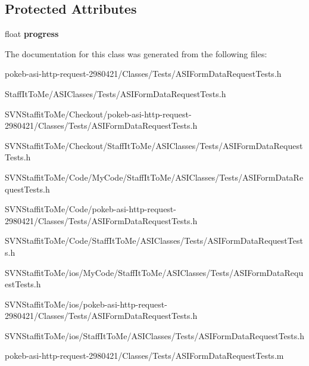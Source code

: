 \subsection*{\-Protected \-Attributes}
\begin{DoxyCompactItemize}
\item 
\hypertarget{interface_a_s_i_form_data_request_tests_a8f8f9838ec97ca7e2b92d8fad2dabdc4}{
float {\bfseries progress}}
\label{interface_a_s_i_form_data_request_tests_a8f8f9838ec97ca7e2b92d8fad2dabdc4}

\end{DoxyCompactItemize}


\-The documentation for this class was generated from the following files\-:\begin{DoxyCompactItemize}
\item 
pokeb-\/asi-\/http-\/request-\/2980421/\-Classes/\-Tests/\-A\-S\-I\-Form\-Data\-Request\-Tests.\-h\item 
\-Staff\-It\-To\-Me/\-A\-S\-I\-Classes/\-Tests/\-A\-S\-I\-Form\-Data\-Request\-Tests.\-h\item 
\-S\-V\-N\-Staffit\-To\-Me/\-Checkout/pokeb-\/asi-\/http-\/request-\/2980421/\-Classes/\-Tests/\-A\-S\-I\-Form\-Data\-Request\-Tests.\-h\item 
\-S\-V\-N\-Staffit\-To\-Me/\-Checkout/\-Staff\-It\-To\-Me/\-A\-S\-I\-Classes/\-Tests/\-A\-S\-I\-Form\-Data\-Request\-Tests.\-h\item 
\-S\-V\-N\-Staffit\-To\-Me/\-Code/\-My\-Code/\-Staff\-It\-To\-Me/\-A\-S\-I\-Classes/\-Tests/\-A\-S\-I\-Form\-Data\-Request\-Tests.\-h\item 
\-S\-V\-N\-Staffit\-To\-Me/\-Code/pokeb-\/asi-\/http-\/request-\/2980421/\-Classes/\-Tests/\-A\-S\-I\-Form\-Data\-Request\-Tests.\-h\item 
\-S\-V\-N\-Staffit\-To\-Me/\-Code/\-Staff\-It\-To\-Me/\-A\-S\-I\-Classes/\-Tests/\-A\-S\-I\-Form\-Data\-Request\-Tests.\-h\item 
\-S\-V\-N\-Staffit\-To\-Me/ios/\-My\-Code/\-Staff\-It\-To\-Me/\-A\-S\-I\-Classes/\-Tests/\-A\-S\-I\-Form\-Data\-Request\-Tests.\-h\item 
\-S\-V\-N\-Staffit\-To\-Me/ios/pokeb-\/asi-\/http-\/request-\/2980421/\-Classes/\-Tests/\-A\-S\-I\-Form\-Data\-Request\-Tests.\-h\item 
\-S\-V\-N\-Staffit\-To\-Me/ios/\-Staff\-It\-To\-Me/\-A\-S\-I\-Classes/\-Tests/\-A\-S\-I\-Form\-Data\-Request\-Tests.\-h\item 
pokeb-\/asi-\/http-\/request-\/2980421/\-Classes/\-Tests/\-A\-S\-I\-Form\-Data\-Request\-Tests.\-m\item 

\end{DoxyCompactItemize}
